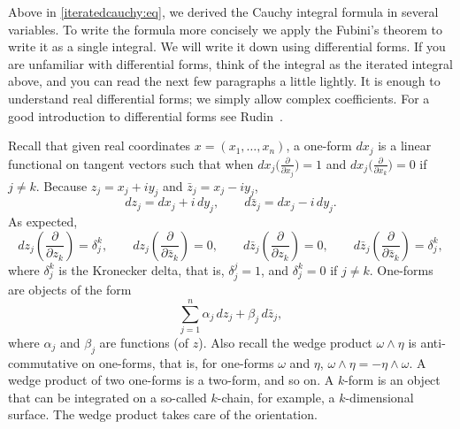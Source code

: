 \documentclass[12pt,openany]{book}
\theoremstyle{plain}
\theoremstyle{remark}
\theoremstyle{definition}
\theoremstyle{exercise}
\theoremstyle{example}
\begin{document}

Above in \eqref{iteratedcauchy:eq}, we derived the Cauchy integral formula in several variables.  To
write the formula more concisely we apply the Fubini's theorem to write it as
a single integral.  We will write it down using differential forms.  If you
are unfamiliar with differential forms, think of the integral
as the iterated integral above, and you can read the next few paragraphs
a little lightly.
It is enough to understand real differential forms; we simply allow
complex coefficients.
For a good introduction to differential forms
see Rudin~\cite{Rudin:principles}.

Recall that given real coordinates $x = (x_1,\ldots,x_n)$, a one-form $d x_j$ is a linear functional on tangent vectors
such that when $d x_j \bigl( \frac{\partial}{\partial x_j} \bigr) = 1$ and
$d x_j \bigl( \frac{\partial}{\partial x_k} \bigr) = 0$ if $j \not= k$.
Because
$z_j = x_j + i y_j$ and
$\bar{z}_j = x_j - i y_j$,
%
\begin{equation*}
d z_j = d x_j + i \, d y_j , 
\qquad
d \bar{z}_j = d x_j - i \, d y_j . 
\end{equation*}
As expected,
\begin{equation*}
d z_j \left( \frac{\partial}{\partial z_k} \right) = \delta_j^k ,
\qquad
d z_j \left( \frac{\partial}{\partial \bar{z}_k} \right) = 0 ,
\qquad
d \bar{z}_j \left( \frac{\partial}{\partial z_k} \right) = 0 ,
\qquad
d \bar{z}_j \left( \frac{\partial}{\partial \bar{z}_k} \right) = \delta_j^k
,
\end{equation*}
%
where $\delta_{j}^k$ is the Kronecker delta, that is, $\delta_j^j = 1$,
and $\delta_j^k = 0$ if $j \not= k$.  One-forms are objects of the form
\begin{equation*}
\sum_{j=1}^n \alpha_j \, d z_j + 
\beta_j \, d \bar{z}_j ,
\end{equation*}
where $\alpha_j$ and $\beta_j$ are functions (of $z$).
Also recall the wedge product $\omega \wedge \eta$ is anti-commutative on
one-forms,
that is, for one-forms $\omega$ and $\eta$,
$\omega \wedge \eta = - \eta \wedge \omega$.  A wedge product of two
one-forms is a two-form, and so on.  A $k$-form is an object that 
can be integrated on a so-called $k$-chain, for example, a
$k$-dimensional surface.  The wedge product takes care of the orientation.
\end{document}
